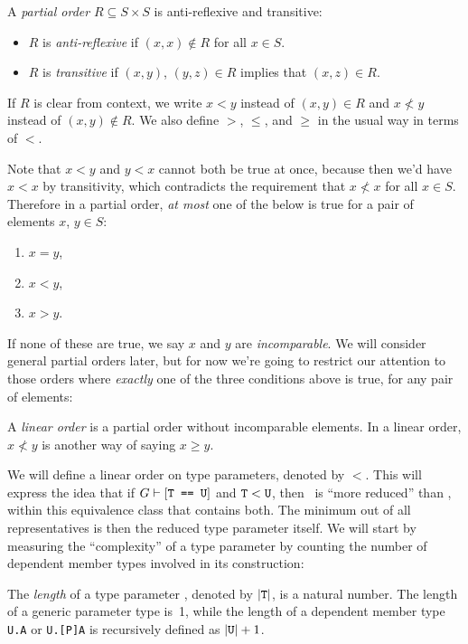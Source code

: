 \documentclass[../generics]{subfiles}
\begin{document}
\begin{definition}\label{def order}
A \emph{partial order} $R\subseteq S\times S$ is anti-reflexive and transitive:
\begin{itemize}
\item $R$ is \emph{anti-reflexive} if $(x,x)\notin R$ for all $x\in S$.
\item $R$ is \emph{transitive} if $(x,y)$, $(y,z)\in R$ implies that $(x,z)\in R$.
\end{itemize}
If $R$ is clear from context, we write $x<y$ instead of $(x,y)\in R$ and $x\not< y$ instead of $(x,y)\notin R$. We also define $>$, $\leq$, and $\geq$ in the usual way in terms of $<$.
\end{definition}
Note that $x<y$ and $y<x$ cannot both be true at once, because then we'd have $x<x$ by transitivity, which contradicts the requirement that $x\not< x$ for all $x\in S$. Therefore in a partial order, \emph{at most} one of the below is true for a pair of elements $x$, $y\in S$:
\begin{enumerate}
\item $x=y$,
\item $x<y$,
\item $x>y$.
\end{enumerate}
If none of these are true, we say $x$ and $y$ are \emph{incomparable}. We will consider general partial orders later, but for now we're going to restrict our attention to those orders where \emph{exactly} one of the three conditions above is true, for any pair of elements:
\begin{definition}
A \emph{linear order} is a partial order without incomparable elements. In a linear order, $x\not< y$ is another way of saying $x \geq y$.
\end{definition}

We will define a linear order on type parameters, denoted by $<$. This will express the idea that if $G\vdash[\texttt{T == U}]$ and $\texttt{T}<\texttt{U}$, then \tT\ is ``more reduced'' than \tU, within this equivalence class that contains both. The minimum out of all representatives is then the reduced type parameter itself. We will start by measuring the ``complexity'' of a type parameter by counting the number of dependent member types involved in its construction:
\begin{definition}
The \emph{length} of a type parameter \tT, denoted by $|\texttt{T}|$, is a natural number. The length of a generic parameter type is~1, while the length of a dependent member type \texttt{U.A} or \texttt{U.[P]A} is recursively defined as $|\texttt{U}|+1$.
\end{definition}
\end{document}
